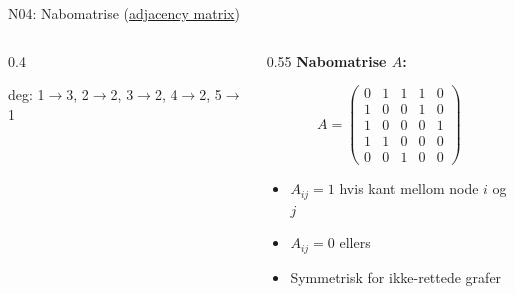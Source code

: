 \documentclass[aspectratio=169, 10pt]{beamer}
\begin{document}
\begin{frame}{N04: Nabomatrise (\href{https://en.wikipedia.org/wiki/Adjacency_matrix}{adjacency matrix})}
    
    \begin{columns}
        \begin{column}{0.4\textwidth}
            \begin{center}
            \end{center}
            \scriptsize
            deg: 1$\rightarrow$3, 2$\rightarrow$2, 3$\rightarrow$2, 4$\rightarrow$2, 5$\rightarrow$1
        \end{column}
        
        \begin{column}{0.55\textwidth}
            \textbf{Nabomatrise $A$:}
            
            \[
            A = \begin{pmatrix}
            0 & 1 & 1 & 1 & 0 \\
            1 & 0 & 0 & 1 & 0 \\
            1 & 0 & 0 & 0 & 1 \\
            1 & 1 & 0 & 0 & 0 \\
            0 & 0 & 1 & 0 & 0
            \end{pmatrix}
            \]
            
            \begin{itemize}
                \item $A_{ij} = 1$ hvis kant mellom node $i$ og $j$
                \item $A_{ij} = 0$ ellers
                \item Symmetrisk for ikke-rettede grafer
            \end{itemize}
        \end{column}
    \end{columns}
    

\end{frame}
\end{document}
